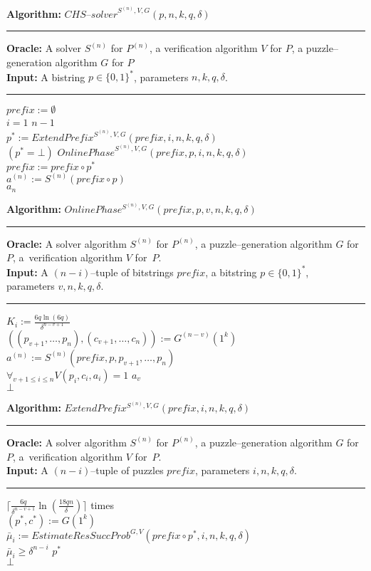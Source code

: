 \begin{codeblock}
  \textbf{Algorithm:} $\mathit{CHS\text{--}solver}^{S^{(n)},V,G}(p, n, k, q, \delta)$
  \medskip\hrule
  \textbf{Oracle:} A solver $S^{(n)}$ for $P^{(n)}$, a verification algorithm $V$ for $P$, a puzzle--generation algorithm $G$ for $P$\\
  \textbf{Input:}  A bistring $p \in \{0,1\}^{*}$, parameters $n, k, q, \delta$.
  \medskip\hrule
  $\mathit{prefix} := \emptyset$\\
  \For $i = 1$ \To $n-1$ \Do \\
  \IndI $p^* := \mathit{ExtendPrefix}^{S^{(n)}, V, G}(\mathit{prefix}, i, n, k, q, \delta)$\\
  \IndI \If $(p^* = \bot)$ \Then \Return $\mathit{OnlinePhase}^{S^{(n)}, V, G}(\mathit{prefix}, p, i, n, k, q, \delta)$ \\
  \IndI \Else $\mathit{prefix} := \mathit{prefix} \circ p^*$\\
  $ a^{(n)} := S^{(n)}(\mathit{prefix} \circ p)$ \\
  \Return $a_n$
\end{codeblock}
%
\begin{codeblock}
  \textbf{Algorithm:} $\mathit{OnlinePhase^{S^{(n)}, V, G}(\mathit{prefix}, p, v, n, k, q, \delta)}$
  \medskip \hrule
  \textbf{Oracle:} A solver algorithm $S^{(n)}$ for $P^{(n)}$, a puzzle--generation algorithm $G$ for $P$, a~verification algorithm $V$ for~$P$.\\
  \textbf{Input:} A $(n-i)$--tuple of bitstrings $\mathit{prefix}$, a bitstring $p \in \{0,1\}^{*}$, \\ parameters $v, n, k, q, \delta$.
  \medskip\hrule
  \Repeat $K_i := \frac{6q \ln (6q)}{\delta^{n-v+1}}$ \\
  \IndI $((p_{v+1}, \dotsc, p_{n}),(c_{v+1}, \dots, c_n)) := G^{(n-v)}(1^k)$\\
  \IndI $a^{(n)} := S^{(n)}(\mathit{prefix}, p, p_{v+1}, \dotsc, p_n)$\\
  \IndI \If $\forall_{v+1 \leq i \leq n} V(p_i, c_i, a_i) = 1$ \Then \Return $a_v$\\
  \Return $\bot$
\end{codeblock}
%
\begin{codeblock}
  \textbf{Algorithm:} $\mathit{ExtendPrefix^{S^{(n)}, V, G}(prefix, i, n, k, q, \delta)}$
  \medskip \hrule
  \textbf{Oracle:} A solver algorithm $S^{(n)}$ for $P^{(n)}$, a puzzle--generation algorithm $G$ for $P$, a~verification algorithm $V$ for~$P$.\\
  \textbf{Input:} A $(n-i)$--tuple of puzzles $\mathit{prefix}$, parameters $i, n, k, q, \delta$.
  \medskip\hrule
  \Repeat $\Big\lceil \frac{6q}{\delta^{n-v+1}} \ln (\frac{18qn}{\delta}) \Big\rceil$ times \Do \\
  \IndI $(p^*, c^*) := G(1^k) $\\
  \IndI $\bar{\mu}_i := \mathit{EstimateResSuccProb}^{G,V}(\mathit{prefix} \circ p^*, i, n, k, q, \delta)$\\
  \IndI \If $\bar{\mu}_i \geq \delta^{n-i}$ \Then \Return $p^*$ \\
  \Return $\bot$
\end{codeblock}
